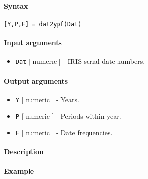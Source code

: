 


	\paragraph{Syntax}\label{syntax}

\begin{verbatim}
[Y,P,F] = dat2ypf(Dat)
\end{verbatim}

\paragraph{Input arguments}\label{input-arguments}

\begin{itemize}
\itemsep1pt\parskip0pt
\item
  \texttt{Dat} {[} numeric {]} - IRIS serial date numbers.
\end{itemize}

\paragraph{Output arguments}\label{output-arguments}

\begin{itemize}
\item
  \texttt{Y} {[} numeric {]} - Years.
\item
  \texttt{P} {[} numeric {]} - Periods within year.
\item
  \texttt{F} {[} numeric {]} - Date frequencies.
\end{itemize}

\paragraph{Description}\label{description}

\paragraph{Example}\label{example}


